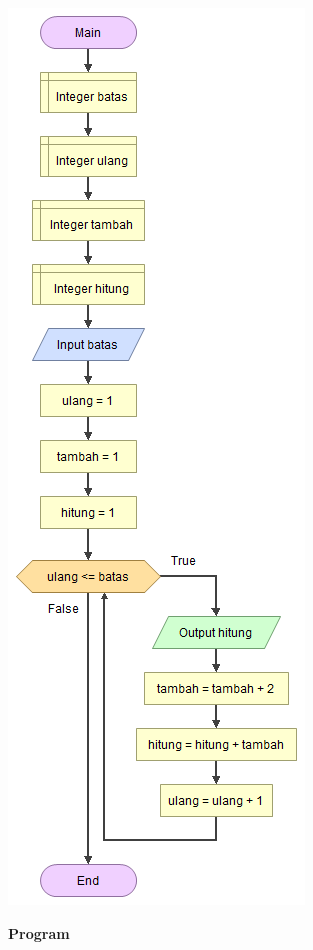 \documentclass[a4paper,12pt]{article}
\begin{document}
\begin{center}
	\includegraphics[scale=.5]{main}
\end{center}
{\bfseries Program\\}
\end{document}
